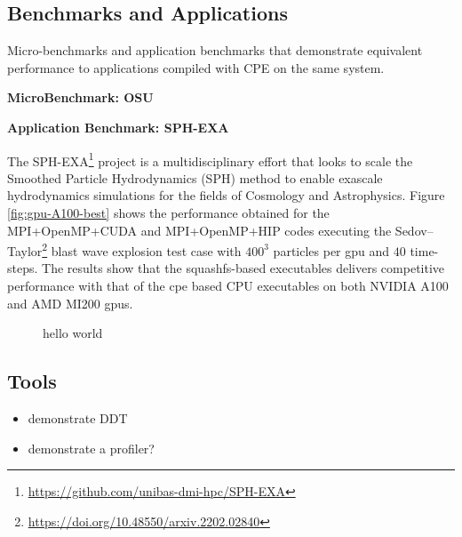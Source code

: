 \subsection{Benchmarks and Applications}


Micro-benchmarks and application benchmarks that demonstrate equivalent performance to applications compiled with CPE on the same system.

\noindent\textbf{MicroBenchmark: OSU}


\noindent\textbf{Application Benchmark: SPH-EXA}

The SPH-EXA\footnote{\url{https://github.com/unibas-dmi-hpc/SPH-EXA}} project is a multidisciplinary effort that looks to scale the Smoothed Particle Hydrodynamics (SPH) method to enable exascale hydrodynamics simulations for the fields of Cosmology and Astrophysics. 
Figure \ref{fig:gpu-A100-best} shows the performance obtained for the MPI+OpenMP+CUDA and MPI+OpenMP+HIP codes executing the Sedov--Taylor\footnote{\url{https://doi.org/10.48550/arxiv.2202.02840}} blast wave explosion test case with $400^3$ particles per gpu and $40$ time-steps.
The results show that the squashfs-based executables delivers competitive performance with that of the cpe based CPU executables on both NVIDIA A100 and AMD MI200 gpus.

\begin{figure*}[htp!]
    
    \hfill
    

    \caption{hello world}
    \label{fig:gpu-MI200-best}
\end{figure*}

\subsection{Tools}


\begin{itemize}
    \item demonstrate DDT
    \item demonstrate a profiler?
\end{itemize}

